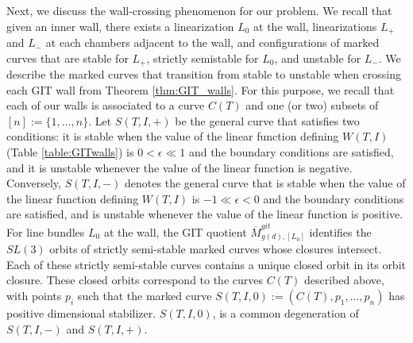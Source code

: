 \documentclass{amsart}
\newcommand{\mc}{\mathcal}
\numberwithin{equation}{section}
\theoremstyle{definition}
\begin{document}

Next, we discuss the wall-crossing phenomenon for our problem. We recall that given an inner wall, there exists a linearization $L_0$ at the wall, linearizations $L_{+}$ and $L_{-}$ at each chambers adjacent to the wall, and configurations of marked curves that are stable for $L_{+}$, strictly semistable for $L_0$, and unstable for $L_{-}$.  We describe the marked curves that transition from stable to unstable when crossing each GIT wall from Theorem  \ref{thm:GIT_walls}. For this purpose, we recall that each of our walls is associated to a curve $C(T)$ and one (or two) subsets of $[n] := \{1, \dots , n\}$. Let $S(T, I, +)$ be the general curve that satisfies two conditions: it is stable when the value of the linear function defining $W(T,I)$ (Table \ref{table:GITwalls}) is $0< \epsilon \ll 1$ and the boundary conditions are satisfied, and it is unstable whenever the value of the linear function is negative. Conversely, $S(T, I, -)$ denotes the general curve that is stable when the value of the linear function defining $W(T,I)$ is $-1 \ll \epsilon < 0$ and the boundary conditions are satisfied, and is unstable whenever the value of the linear function is positive. For line bundles $L_0$ at the wall, the GIT quotient $\overline{M}^{git}_{g(d),[L_0]}$ identifies the $SL(3)$ orbits of strictly semi-stable marked curves whose closures intersect. Each of these strictly semi-stable curves contains a unique closed orbit in its orbit closure. These closed orbits correspond to the curves $C(T)$ described above, with points $p_i$ such that the marked curve $S(T,I,0) := (C(T), p_1, \dots, p_n)$ has positive dimensional stabilizer. $S(T,I,0)$, is a common degeneration of $S(T,I,-)$ and $S(T,I,+)$. 


\end{document}
